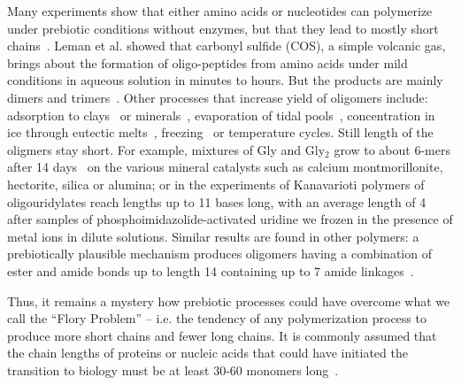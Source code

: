 \documentclass[5p,times]{elsarticle}
\begin{document}
Many experiments show that either amino acids or nucleotides can polymerize 
under prebiotic conditions without enzymes, but that they lead to mostly short 
chains~\cite{Shock1992,Martin1998,PAECHT-HOROWITZ1970,Leman2004a,Orgel2004}.  Leman et al. showed 
that carbonyl sulfide (COS), a simple volcanic gas, brings about the formation of oligo-peptides 
from amino acids under mild conditions in aqueous solution in minutes to hours. But the products are 
mainly dimers and trimers~\cite{Leman2004a}.  Other processes that increase yield of  
oligomers include: adsorption to clays~\cite{Rao1980,Lambert2008} or 
minerals~\cite{Bernal1949,Ferris1996}, evaporation of tidal 
pools~\cite{Nelson2001}, concentration in ice through eutectic melts~\cite{Kanavarioti2001},  
freezing~\cite{Bada2004} or temperature cycles. Still length of the oligmers stay short.  For 
example, mixtures of Gly and Gly$_2$ grow to about 
6-mers after 14 days~\cite{Rode1997,Rode1999} on the various mineral catalysts such 
as calcium montmorillonite, hectorite, silica or alumina; or in the experiments of Kanavarioti 
polymers of oligouridylates reach lengths up to 11 bases long, with an average length of 4 
\cite{Kanavarioti2001} after samples of 
phosphoimidazolide-activated uridine we frozen in the presence of metal ions in dilute solutions.  
 Similar results are found in other polymers: a prebiotically 
plausible mechanism produces oligomers having a combination of ester and amide bonds up to length 14 
containing up to 7 amide linkages~\cite{Forsythe2015}.  

Thus, it remains a mystery how prebiotic processes could have overcome what we call the ``Flory 
Problem'' -- i.e. the tendency of any polymerization process to produce more short chains and fewer 
long chains.  It is commonly assumed that the chain lengths of proteins or nucleic acids that could 
have initiated the transition to biology must be at least 30-60 monomers long~\cite{Szostak1993}.  
 
\end{document}
